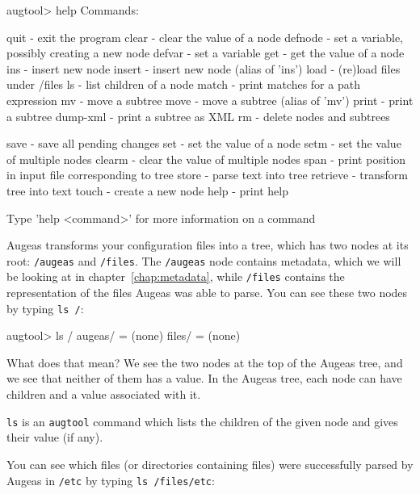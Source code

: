 \nopagebreak
\begin{augtoolsh}[]
augtool> help
Commands:

    quit       - exit the program
    clear      - clear the value of a node
    defnode    - set a variable, possibly creating a new node
    defvar     - set a variable
    get        - get the value of a node
    ins        - insert new node
    insert     - insert new node (alias of 'ins')
    load       - (re)load files under /files
    ls         - list children of a node
    match      - print matches for a path expression
    mv         - move a subtree
    move       - move a subtree (alias of 'mv')
    print      - print a subtree
    dump-xml   - print a subtree as XML
    rm         - delete nodes and subtrees
\end{augtoolsh}
\begin{augtoolsh}[]
    save       - save all pending changes
    set        - set the value of a node
    setm       - set the value of multiple nodes
    clearm     - clear the value of multiple nodes
    span       - print position in input file corresponding to tree
    store      - parse text into tree
    retrieve   - transform tree into text
    touch      - create a new node
    help       - print help

Type 'help <command>' for more information on a command
\end{augtoolsh}


Augeas transforms your configuration files into a tree,
 which has two nodes at its root: \texttt{/augeas} and \texttt{/files}.
 The \texttt{/augeas} node contains metadata, which we will be looking at in chapter~\ref{chap:metadata},
 while \texttt{/files} contains the representation of the files Augeas was able to parse.
 You can see these two nodes by typing \verb!ls /!:


\begin{augtoolsh}[]
augtool> ls /
augeas/ = (none)
files/ = (none)
\end{augtoolsh}

What does that mean? We see the two nodes at the top of the Augeas tree, and we see that neither of them has a value. In the Augeas tree, each node can have children and a value associated with it.

\verb!ls! is an \verb!augtool! command which lists the children of the given node and gives their value (if any).

You can see which files (or directories containing files) were successfully parsed by Augeas in \texttt{/etc} by typing \verb!ls /files/etc!:

